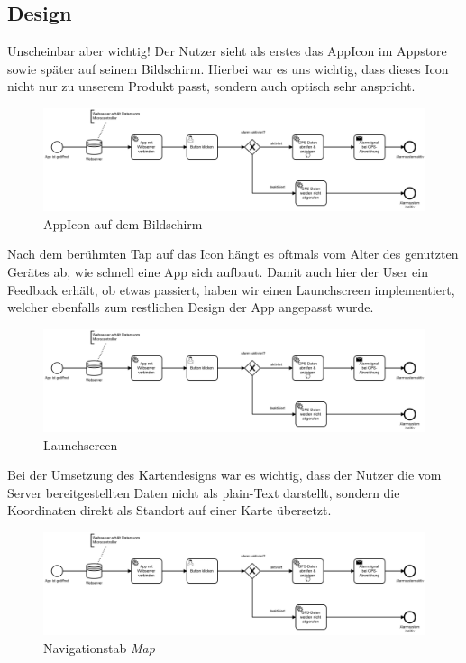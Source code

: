 \subsection{Design}


Unscheinbar aber wichtig! Der Nutzer sieht als erstes das AppIcon im Appstore sowie später auf seinem Bildschirm. Hierbei war es uns wichtig, dass dieses Icon nicht nur zu unserem Produkt passt, sondern auch optisch sehr anspricht.
\begin{figure} [H]
	\begin{center}
		\includegraphics[width=1\textwidth]{Bilder/iOS_camunda.png}
		\caption{AppIcon auf dem Bildschirm}
		\label{AppIcon}
	\end{center}
\end{figure}
Nach dem berühmten Tap auf das Icon hängt es oftmals vom Alter des genutzten Gerätes ab, wie schnell eine App sich aufbaut. Damit auch hier der User ein Feedback erhält, ob  etwas passiert, haben wir einen Launchscreen implementiert, welcher ebenfalls zum restlichen Design der App angepasst wurde.
\begin{figure} [H]
	\begin{center}
		\includegraphics[width=1\textwidth]{Bilder/iOS_camunda.png}
		\caption{Launchscreen}
		\label{Launch}
	\end{center}
\end{figure}

Bei der Umsetzung des Kartendesigns war es wichtig, dass der Nutzer die vom Server bereitgestellten Daten nicht als plain-Text darstellt, sondern die Koordinaten direkt als Standort auf einer Karte übersetzt.
\begin{figure} [H]
	\begin{center}
		\includegraphics[width=1\textwidth]{Bilder/iOS_camunda.png}
		\caption{Navigationstab \textit{Map}}
		\label{Map}
	\end{center}
\end{figure}



